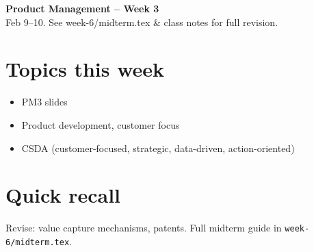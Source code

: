 \documentclass[10pt,a4paper]{article}
\begin{document}
\begin{center}
{\large\bfseries\color{eublue} Product Management -- Week 3}\\[0.2em]
\footnotesize Feb 9--10. See week-6/midterm.tex \& class notes for full revision.
\end{center}\vspace{0.5em}

\section*{\color{eublue}Topics this week}
\begin{itemize}
\item PM3 slides
\item Product development, customer focus
\item CSDA (customer-focused, strategic, data-driven, action-oriented)
\end{itemize}

\section*{Quick recall}
Revise: value capture mechanisms, patents. Full midterm guide in \texttt{week-6/midterm.tex}.
\end{document}

